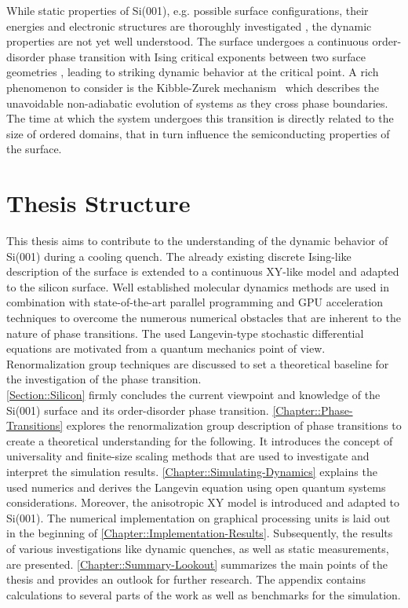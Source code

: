 	While static properties of Si(001), e.g. possible surface configurations, their energies and electronic structures are thoroughly investigated \cite{ramstad1995theoretical,pillay2004revisit, matsumoto2003low,tochihara1994low}, the dynamic properties \cite{schaller2023sequential} are not yet well understood. The surface undergoes a continuous order-disorder phase transition with Ising critical exponents \cite{brand2023critical} between two surface geometries \cite{tabata1987order}, leading to striking dynamic behavior at the critical point. A rich phenomenon to consider is the Kibble-Zurek mechanism~\cite{kibble1976topology, zurek1985cosmological, zurek1996cosmological} which describes the unavoidable non-adiabatic evolution of systems as they cross phase boundaries. The time at which the system undergoes this transition is directly related to the size of ordered domains, that in turn influence the semiconducting \cite{himpsel1979photoemission, uhrberg1981experimental, handa1989plasma} properties of the surface. \\
	
	\section{Thesis Structure}
	This thesis aims to contribute to the understanding of the dynamic behavior of Si(001) during a cooling quench. The already existing discrete Ising-like description of the surface is extended to a continuous XY-like model and adapted to the silicon surface. Well established molecular dynamics methods are used in combination with state-of-the-art parallel programming and GPU acceleration techniques to overcome the numerous numerical obstacles that are inherent to the nature of phase transitions. The used Langevin-type stochastic differential equations are motivated from a quantum mechanics point of view. Renormalization group techniques are discussed to set a theoretical baseline for the investigation of the phase transition. \\
	
	\autoref{Section::Silicon} firmly concludes the current viewpoint  and knowledge of the Si(001) surface and its order-disorder phase transition. \autoref{Chapter::Phase-Transitions} explores the renormalization group description of phase transitions to create a theoretical understanding for the following. It introduces the concept of universality and finite-size scaling methods that are used to investigate and interpret the simulation results.  \autoref{Chapter::Simulating-Dynamics} explains the used numerics and derives the Langevin equation using open quantum systems considerations. Moreover, the anisotropic XY model is introduced and adapted to Si(001). The numerical implementation on graphical processing units is laid out in the beginning of \autoref{Chapter::Implementation-Results}. Subsequently, the results of various investigations like dynamic quenches, as well as static measurements, are presented. \autoref{Chapter::Summary-Lookout} summarizes the main points of the thesis and provides an outlook for further research. The appendix contains calculations to several parts of the work as well as benchmarks for the simulation. \\
